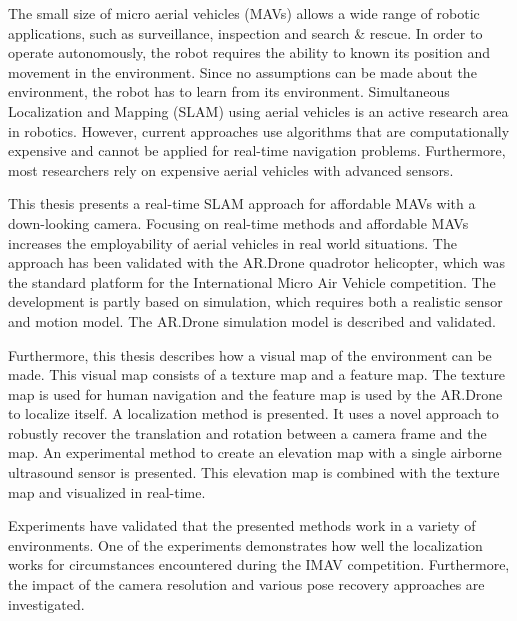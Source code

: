 The small size of micro aerial vehicles (MAVs) allows a wide range of robotic applications, such as surveillance, inspection and search \& rescue.
In order to operate autonomously, the robot requires the ability to known its position and movement in the environment.
Since no assumptions can be made about the environment, the robot has to learn from its environment.
Simultaneous Localization and Mapping (SLAM) using aerial vehicles is an active research area in robotics.
However, current approaches use algorithms that are computationally expensive and cannot be applied for real-time navigation problems.
Furthermore, most researchers rely on expensive aerial vehicles with advanced sensors.

This thesis presents a real-time SLAM approach for affordable MAVs with a down-looking camera.
Focusing on real-time methods and affordable MAVs increases the employability of aerial vehicles in  real world situations.
The approach has been validated with the AR.Drone quadrotor helicopter, which was the standard platform for the International Micro Air Vehicle competition.
The development is partly based on simulation, which requires both a realistic sensor and motion model.
The AR.Drone simulation model is described and validated.

Furthermore, this thesis describes how a visual map of the environment can be made.
This visual map consists of a texture map and a feature map. The texture map is used for human navigation and the feature map is used by the AR.Drone to localize itself.
A localization method is presented.
It uses a novel approach to robustly recover the translation and rotation between a camera frame and the map.
An experimental method to create an elevation map with a single airborne ultrasound sensor is presented.
This elevation map is combined with the texture map and visualized in real-time.

Experiments have validated that the presented methods work in a variety of environments.
One of the experiments demonstrates how well the localization works for circumstances encountered during the IMAV competition. 
Furthermore, the impact of the camera resolution and various pose recovery approaches are investigated.


\vspace{\baselineskip}

